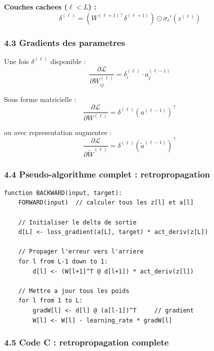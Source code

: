 \documentclass[
  letterpaper,
  DIV=11,
  numbers=noendperiod]{scrartcl}
\begin{document}
\textbf{Couches cachees ($\ell < L$) :}
\[\delta^{(\ell)} = \left(W^{(\ell+1)\top} \delta^{(\ell+1)}\right) \odot \sigma_\ell'(z^{(\ell)})\]

\subsubsection{4.3 Gradients des parametres}\label{gradients-des-parametres}

Une fois \(\delta^{(\ell)}\) disponible :
\[\frac{\partial \mathcal{L}}{\partial W_{ij}^{(\ell)}} = \delta_i^{(\ell)} \cdot a_j^{(\ell-1)}\]

Sous forme matricielle :
\[\frac{\partial \mathcal{L}}{\partial W^{(\ell)}} = \delta^{(\ell)} (a^{(\ell-1)})^\top\]

ou avec representation augmentee :
\[\frac{\partial \mathcal{L}}{\partial \tilde{W}^{(\ell)}} = \delta^{(\ell)} (\tilde{a}^{(\ell-1)})^\top\]

\subsubsection{4.4 Pseudo-algorithme complet : retropropagation}\label{pseudo-algo-backprop}

\begin{verbatim}
function BACKWARD(input, target):
    FORWARD(input)  // calculer tous les z[l] et a[l]

    // Initialiser le delta de sortie
    d[L] <- loss_gradient(a[L], target) * act_deriv(z[L])

    // Propager l'erreur vers l'arriere
    for l from L-1 down to 1:
        d[l] <- (W[l+1]^T @ d[l+1]) * act_deriv(z[l])

    // Mettre a jour tous les poids
    for l from 1 to L:
        gradW[l] <- d[l] @ (a[l-1])^T     // gradient
        W[l] <- W[l] - learning_rate * gradW[l]
\end{verbatim}

\subsubsection{4.5 Code C : retropropagation complete}\label{code-c-backprop}
\end{document}

